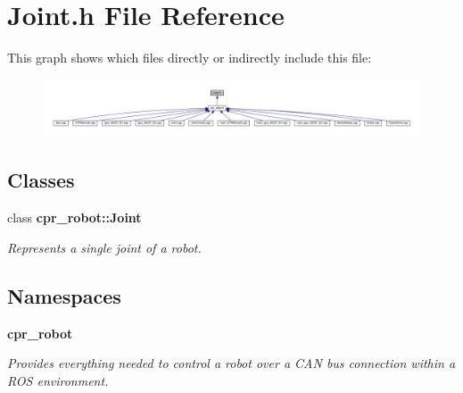 \section{Joint.\+h File Reference}
\label{Joint_8h}
This graph shows which files directly or indirectly include this file\+:
\nopagebreak
\begin{figure}[H]
\begin{center}
\leavevmode
\includegraphics[width=350pt]{Joint_8h__dep__incl}
\end{center}
\end{figure}
\subsection*{Classes}
\begin{DoxyCompactItemize}
\item 
class \textbf{ cpr\+\_\+robot\+::\+Joint}
\begin{DoxyCompactList}\small\item\em Represents a single joint of a robot. \end{DoxyCompactList}\end{DoxyCompactItemize}
\subsection*{Namespaces}
\begin{DoxyCompactItemize}
\item 
 \textbf{ cpr\+\_\+robot}
\begin{DoxyCompactList}\small\item\em Provides everything needed to control a robot over a C\+AN bus connection within a R\+OS environment. \end{DoxyCompactList}\end{DoxyCompactItemize}
